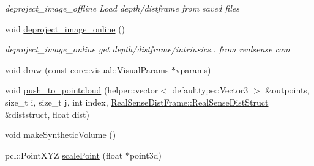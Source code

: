 \begin{DoxyCompactItemize}
\begin{DoxyCompactList}\small\item\em deproject\+\_\+image\+\_\+offline Load depth/distframe from saved files \end{DoxyCompactList}\item 
void \hyperlink{classsofa_1_1rgbdtracking_1_1_real_sense_abstract_deprojector_a899c0a0245338c2b771138f667d1825c}{deproject\+\_\+image\+\_\+online} ()
\begin{DoxyCompactList}\small\item\em deproject\+\_\+image\+\_\+online get depth/distframe/intrinsics.. from realsense cam \end{DoxyCompactList}\item 
void \hyperlink{classsofa_1_1rgbdtracking_1_1_real_sense_abstract_deprojector_a6e270c7bba84a068595aa361aa3f5f3c}{draw} (const core\+::visual\+::\+Visual\+Params $\ast$vparams)
\item 
void \hyperlink{classsofa_1_1rgbdtracking_1_1_real_sense_abstract_deprojector_ad8bc6a2a7cfe182481496dd4e10e6e42}{push\+\_\+to\+\_\+pointcloud} (helper\+::vector$<$ defaulttype\+::\+Vector3 $>$ \&outpoints, size\+\_\+t i, size\+\_\+t j, int index, \hyperlink{structsofa_1_1rgbdtracking_1_1_real_sense_dist_frame_1_1_real_sense_dist_struct}{Real\+Sense\+Dist\+Frame\+::\+Real\+Sense\+Dist\+Struct} \&diststruct, float dist)
\item 
void \hyperlink{classsofa_1_1rgbdtracking_1_1_real_sense_abstract_deprojector_a8f8c43ae9871e46e75b3ff462af093ca}{make\+Synthetic\+Volume} ()
\item 
pcl\+::\+Point\+X\+YZ \hyperlink{classsofa_1_1rgbdtracking_1_1_real_sense_abstract_deprojector_a39b77c197afd5fe30322103da8c75b74}{scale\+Point} (float $\ast$point3d)
\end{DoxyCompactItemize}

